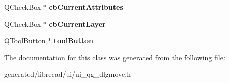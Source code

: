 \begin{DoxyCompactItemize}
\item 
\hypertarget{classUi__QG__DlgMove_a9bcc87c430c31ed18956e04421afd74c}{Q\-Check\-Box $\ast$ {\bfseries cb\-Current\-Attributes}}\label{classUi__QG__DlgMove_a9bcc87c430c31ed18956e04421afd74c}

\item 
\hypertarget{classUi__QG__DlgMove_a7fbd3970b541b27c153ccfe7876d490c}{Q\-Check\-Box $\ast$ {\bfseries cb\-Current\-Layer}}\label{classUi__QG__DlgMove_a7fbd3970b541b27c153ccfe7876d490c}

\item 
\hypertarget{classUi__QG__DlgMove_a50877125f1c70c8c944db8c79c946a0c}{Q\-Tool\-Button $\ast$ {\bfseries tool\-Button}}\label{classUi__QG__DlgMove_a50877125f1c70c8c944db8c79c946a0c}

\end{DoxyCompactItemize}


The documentation for this class was generated from the following file\-:\begin{DoxyCompactItemize}
\item 
generated/librecad/ui/ui\-\_\-qg\-\_\-dlgmove.\-h\end{DoxyCompactItemize}
